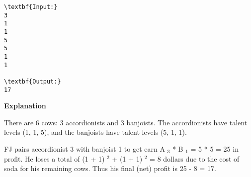 \begin{verbatim}
\textbf{Input:}
3
1
1
5
5
1
1

\textbf{Output:}
17
\end{verbatim}

\textbf{    Explanation   }

   There are 6 cows: 3 accordionists and 3 banjoists. The accordionists have talent levels (1, 1, 5), and the banjoists have talent levels (5, 1, 1).  

   FJ pairs accordionist 3 with banjoist 1 to get earn A   $_    3   $   * B   $_    1   $   = 5 * 5 = 25 in profit.  He loses a total of (1 + 1)   $^    2   $   + (1 + 1)   $^    2   $   = 8 dollars due to the cost of soda for his remaining cows. Thus his final (net) profit is 25 - 8 = 17.